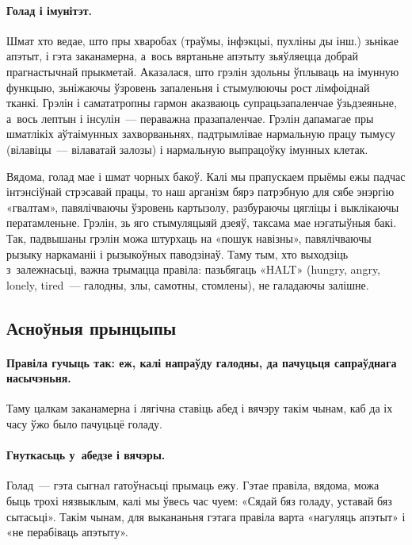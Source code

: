 
\paragraph{Голад і імунітэт.}
Шмат хто ведае, што пры хваробах (траўмы, інфэкцыі, пухліны ды інш.) зьнікае апэтыт, і гэта заканамерна, а~вось вяртаньне апэтыту зьяўляецца добрай прагнастычнай прыкметай. Аказалася, што грэлін здольны ўплываць на імунную функцыю, зьніжаючы ўзровень запаленьня і стымулюючы рост лімфоіднай тканкі. Грэлін і самататропны гармон аказваюць супрацьзапаленчае ўзьдзеяньне, а~вось лептын і інсулін~--- пераважна празапаленчае. Грэлін дапамагае пры шматлікіх аўтаімунных захворваньнях, падтрымлівае нармальную працу тымусу (вілавіцы~--- вілаватай залозы) і нармальную выпрацоўку імунных клетак.

Вядома, голад мае і шмат чорных бакоў. Калі мы прапускаем прыёмы ежы падчас інтэнсіўнай стрэсавай працы, то наш арганізм бярэ патрэбную для сябе энэргію «гвалтам», павялічваючы ўзровень картызолу, разбураючы цягліцы і выклікаючы ператамленьне. Грэлін, зь яго стымуляцыяй дзеяў, таксама мае нэгатыўныя бакі. Так, падвышаны грэлін можа штурхаць на «пошук навізны», павялічваючы рызыку наркаманіі і рызыкоўных паводзінаў. Таму тым, хто выходзіць з~залежнасьці, важна трымацца правіла: пазьбягаць «HALT» (hungry, angry, lonely, tired~--- галодны, злы, самотны, стомлены), не галадаючы залішне.

\subsection{Асноўныя прынцыпы}

\paragraph{Правіла гучыць так: еж, калі напраўду галодны, да пачуцьця сапраўднага насычэньня.}
Таму цалкам заканамерна і лягічна ставіць абед і вячэру такім чынам, каб да іх часу ўжо было пачуцьцё голаду.

\paragraph{Гнуткасьць у~абедзе і вячэры.}
Голад~--- гэта сыгнал гатоўнасьці прымаць ежу. Гэтае правіла, вядома, можа быць трохі нязвыклым, калі мы ўвесь час чуем: «Сядай бяз голаду, уставай бяз сытасьці». Такім чынам, для выкананьня гэтага правіла варта «нагуляць апэтыт» і «не перабіваць апэтыту».

